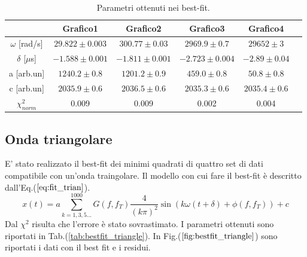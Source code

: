\documentclass{article}
\begin{document}
            \begin{table}[H]
                \centering
                \begin{tabular}{cccccc}
                    \hline
                               & Grafico1              &Grafico2               & Grafico3                &Grafico4 \\
                    \hline
                    $\omega$ [rad/s]    & $29.822\pm 0.003$     & $300.77 \pm 0.03$     & $2969.9\pm 0.7$         & $29652  \pm 3$ \\
                    $\delta$ [$\mu$s]   & $-1.588 \pm 0.001$    & $-1.811 \pm 0.001$    & $-2.723\pm 0.004$       & $-2.89 \pm 0.04$ \\
                    a [arb.un]          & $1240.2\pm 0.8$       & $1201.2\pm 0.9$        & $459.0 \pm 0.8$         & $50.8 \pm 0.8$ \\
                    c [arb.un]          & $2035.9 \pm 0.6$      & $2036.5 \pm 0.6$      & $2035.3 \pm 0.6$        & $2035.4 \pm 0.6$ \\
                    $\chi^{2}_{norm}$   & 0.009                 & 0.009                 & 0.002                   & 0.004 \\
                    \hline
                \end{tabular}
                \caption{Parametri ottenuti nei best-fit.}
                \label{tab:bestfit_sinusoid}
            \end{table}

    \subsection{Onda triangolare}
        E' stato realizzato il best-fit dei minimi quadrati
        di quattro set di dati compatibile con un'onda traingolare.
         Il modello con cui fare il best-fit è descritto dall'Eq.($\ref{eq:fit_trian}$).
            \begin{equation}
                x(t) = a\sum_{k=1,3,5...}^{1000} G(f,f_T)\frac{4}{(k\pi)^2}\sin\left(k\omega (t+\delta)+\phi(f,f_T)\right) +c
                \label{eq:fit_trian}
            \end{equation} 
        Dal $\chi^2$ risulta che l'errore è stato sovrastimato. 
        I parametri ottenuti sono riportati in Tab.(\ref{tab:bestfit_triangle}).%
        In Fig.($\ref{fig:bestfit_triangle}$) sono riportati i dati con il best fit e 
        i residui.
\end{document}
